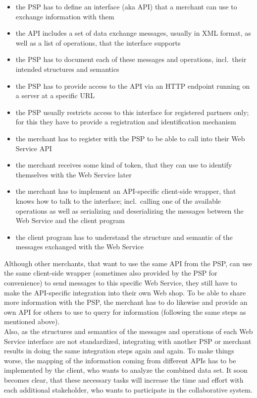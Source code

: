 \begin{itemize}
  \item the \gls{PSP} has to define an interface (aka \gls{API}) that a merchant can use to exchange information with them
  \item the \gls{API} includes a set of data exchange messages, usually in \gls{XML} format, as well as a list of operations, that the interface supports
  \item the \gls{PSP} has to document each of these messages and operations, incl.\ their intended structures and semantics
  \item the \gls{PSP} has to provide access to the \gls{API} via an \gls{HTTP} endpoint running on a server at a specific \gls{URL}
  \item the \gls{PSP} usually restricts access to this interface for registered partners only; for this they have to provide a registration and identification mechanism
  \item the merchant has to register with the \gls{PSP} to be able to call into their Web Service \gls{API}
  \item the merchant receives some kind of token, that they can use to identify themselves with the Web Service later
  \item the merchant has to implement an \gls{API}-specific client-side wrapper, that knows how to talk to the interface; incl.\ calling one of the available operations as well as serializing and deserializing the messages between the Web Service and the client program
  \item the client program has to understand the structure and semantic of the messages exchanged with the Web Service
\end{itemize}

Although other merchants, that want to use the same \gls{API} from the \gls{PSP}, can use the same client-side wrapper (sometimes also provided by the \gls{PSP} for convenience) to send messages to this specific Web Service, they still have to make the \gls{API}-specific integration into their own Web shop. To be able to share more information with the \gls{PSP}, the merchant has to do likewise and provide an own \gls{API} for others to use to query for information (following the same steps as mentioned above). \\

Also, as the structures and semantics of the messages and operations of each Web Service interface are not standardized, integrating with another \gls{PSP} or merchant results in doing the same integration steps again and again. To make things worse, the mapping of the information coming from different \gls{API}s has to be implemented by the client, who wants to analyze the combined data set.   It soon becomes clear, that these necessary tasks will increase the time and effort with each additional stakeholder, who wants to participate in the collaborative system. \\

